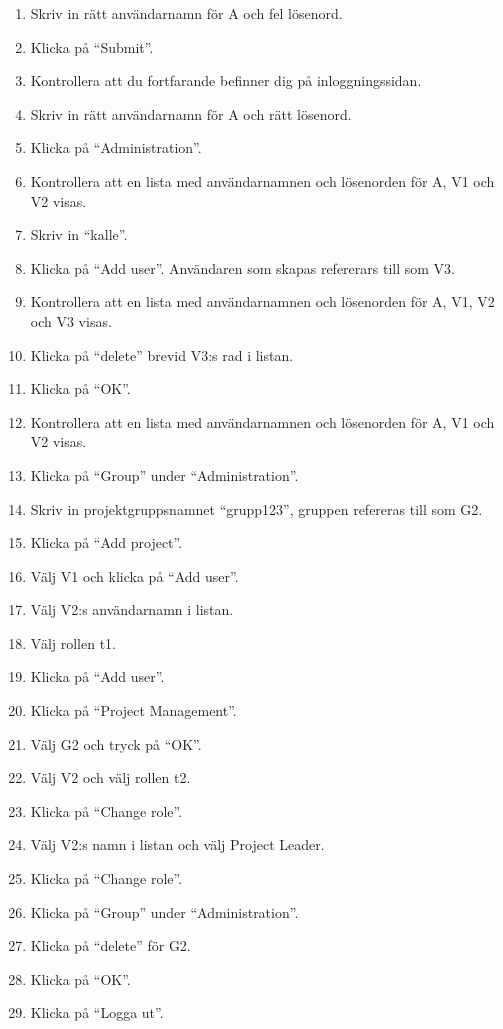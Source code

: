 \documentclass[a4paper]{article}
\begin{document}
\begin{ST}
\begin{enumerate}
\item Skriv in rätt användarnamn för A och fel lösenord.
\item Klicka på ``Submit''.
\item Kontrollera att du fortfarande befinner dig på inloggningssidan.
\item Skriv in rätt användarnamn för A och rätt lösenord.
\item Klicka på ``Administration''.
\item Kontrollera att en lista med användarnamnen och lösenorden för A, V1 och V2 visas.
\item Skriv in ``kalle''.
\item Klicka på ``Add user''. Användaren som skapas refererars till som V3.
\item Kontrollera att en lista med användarnamnen och lösenorden för A, V1, V2 och V3 visas.
\item Klicka på ``delete'' brevid V3:s rad i listan.
\item Klicka på ``OK''.
\item Kontrollera att en lista med användarnamnen och lösenorden för A, V1 och V2 visas.
\item Klicka på ``Group'' under ``Administration''.
\item Skriv in projektgruppsnamnet ``grupp123'', gruppen refereras till som G2.
\item Klicka på ``Add project''.
\item Välj V1 och klicka på ``Add user''.
\item Välj V2:s användarnamn i listan.
\item Välj rollen t1.
\item Klicka på ``Add user''.
\item Klicka på ``Project Management''.
\item Välj G2 och tryck på ``OK''.
\item Välj V2 och välj rollen t2.
\item Klicka på ``Change role''.
\item Välj V2:s namn i listan och välj Project Leader.
\item Klicka på ``Change role''.
\item Klicka på ``Group'' under ``Administration''.
\item Klicka på ``delete'' för G2.
\item Klicka på ``OK''.
\item Klicka på ``Logga ut''. 
\end{enumerate}
\end{ST}
\end{document}
